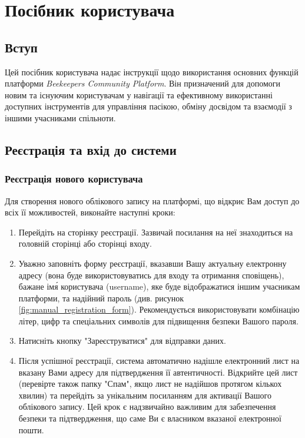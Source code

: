\chapter{Посібник користувача}
\label{app:user_manual}

\section{Вступ}
\label{sec:manual_intro}
Цей посібник користувача надає інструкції щодо використання основних функцій платформи \textit{Beekeepers Community Platform}. Він призначений для допомоги новим та існуючим користувачам у навігації та ефективному використанні доступних інструментів для управління пасікою, обміну досвідом та взаємодії з іншими учасниками спільноти.

\section{Реєстрація та вхід до системи}
\label{sec:manual_auth}

\subsection{Реєстрація нового користувача}
\label{subsec:manual_registration}
Для створення нового облікового запису на платформі, що відкриє Вам доступ до всіх її можливостей, виконайте наступні кроки:
\begin{enumerate}
    \item Перейдіть на сторінку реєстрації. Зазвичай посилання на неї знаходиться на головній сторінці або сторінці входу.
    \item Уважно заповніть форму реєстрації, вказавши Вашу актуальну електронну адресу (вона буде використовуватись для входу та отримання сповіщень), бажане ім\'я користувача (username), яке буде відображатися іншим учасникам платформи, та надійний пароль (див. рисунок \ref{fig:manual_registration_form}). Рекомендується використовувати комбінацію літер, цифр та спеціальних символів для підвищення безпеки Вашого пароля.
    \item Натисніть кнопку "Зареєструватися" для відправки даних.
    \item Після успішної реєстрації, система автоматично надішле електронний лист на вказану Вами адресу для підтвердження її автентичності. Відкрийте цей лист (перевірте також папку "Спам", якщо лист не надійшов протягом кількох хвилин) та перейдіть за унікальним посиланням для активації Вашого облікового запису. Цей крок є надзвичайно важливим для забезпечення безпеки та підтвердження, що саме Ви є власником вказаної електронної пошти.
\end{enumerate}

